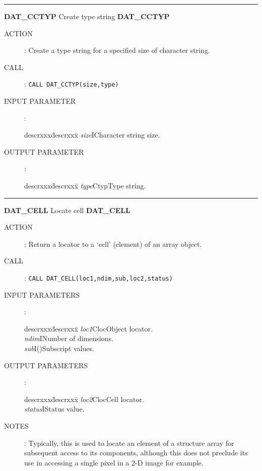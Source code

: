 \goodbreak
\rule{\textwidth}{0.3mm}
{\Large {\bf DAT\_CCTYP} \hfill Create type string \hfill {\bf DAT\_CCTYP}}
\begin{description}
\item [ACTION]:
Create a type string for a specified size of character string.
\item [CALL]:
{\tt CALL DAT\_CCTYP(size,type)}
\item [INPUT PARAMETER]:
\begin{tabbing}
descrxxx\=descrxxx\=\kill
{\em size}\>I\>Character string size.
\end{tabbing}
\item [OUTPUT PARAMETER]:
\begin{tabbing}
descrxxx\=descrxxx\=\kill
{\em type}\>Ctyp\>Type string.
\end{tabbing}
\end{description}
\goodbreak
\rule{\textwidth}{0.3mm}
{\Large {\bf DAT\_CELL} \hfill Locate cell \hfill {\bf DAT\_CELL}}
\begin{description}
\item [ACTION]:
Return a locator to a `cell' (element) of an array object.
\item [CALL]:
{\tt CALL DAT\_CELL(loc1,ndim,sub,loc2,status)}
\item [INPUT PARAMETERS]:
\begin{tabbing}
descrxxx\=descrxxx\=\kill
{\em loc1}\>Cloc\>Object locator.\\
{\em ndim}\>I\>Number of dimensions.\\
{\em sub}\>I()\>Subscript values.
\end{tabbing}
\item [OUTPUT PARAMETERS]:
\begin{tabbing}
descrxxx\=descrxxx\=\kill
{\em loc2}\>Cloc\>Cell locator.\\
{\em status}\>I\>Status value.
\end{tabbing}
\item [NOTES]:
Typically, this is used to locate an element of a structure array for
subsequent access to its components, although this does not preclude its use
in accessing a single pixel in a 2-D image for example.
\end{description}
\goodbreak

